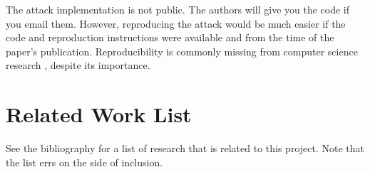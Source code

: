\documentclass{acm_proc_article-sp}
\begin{document}
The attack implementation is not public. The authors will give you the code if
you email them. However, reproducing the attack would be much easier if the code
and reproduction instructions were available and from the time of the paper's
publication. Reproducibility is commonly missing from computer science research
\cite{moraila2013measuring}, despite its importance.

\section{Related Work List}

See the bibliography for a list of research that is related to this project.
Note that the list errs on the side of inclusion.

\nocite{*}



\end{document}
